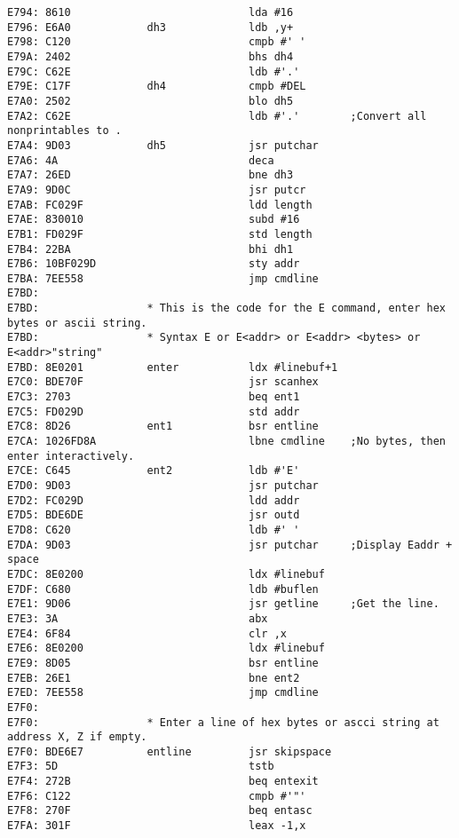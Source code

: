 {\begin{verbatim}
E794: 8610                            lda #16
E796: E6A0            dh3             ldb ,y+
E798: C120                            cmpb #' '
E79A: 2402                            bhs dh4
E79C: C62E                            ldb #'.'            
E79E: C17F            dh4             cmpb #DEL
E7A0: 2502                            blo dh5
E7A2: C62E                            ldb #'.'        ;Convert all nonprintables to .
E7A4: 9D03            dh5             jsr putchar
E7A6: 4A                              deca
E7A7: 26ED                            bne dh3
E7A9: 9D0C                            jsr putcr
E7AB: FC029F                          ldd length
E7AE: 830010                          subd #16
E7B1: FD029F                          std length
E7B4: 22BA                            bhi dh1
E7B6: 10BF029D                        sty addr
E7BA: 7EE558                          jmp cmdline
E7BD:                 
E7BD:                 * This is the code for the E command, enter hex bytes or ascii string.
E7BD:                 * Syntax E or E<addr> or E<addr> <bytes> or E<addr>"string"
E7BD: 8E0201          enter           ldx #linebuf+1
E7C0: BDE70F                          jsr scanhex
E7C3: 2703                            beq ent1
E7C5: FD029D                          std addr
E7C8: 8D26            ent1            bsr entline
E7CA: 1026FD8A                        lbne cmdline    ;No bytes, then enter interactively.            
E7CE: C645            ent2            ldb #'E'
E7D0: 9D03                            jsr putchar
E7D2: FC029D                          ldd addr 
E7D5: BDE6DE                          jsr outd
E7D8: C620                            ldb #' '
E7DA: 9D03                            jsr putchar     ;Display Eaddr + space
E7DC: 8E0200                          ldx #linebuf
E7DF: C680                            ldb #buflen
E7E1: 9D06                            jsr getline     ;Get the line.
E7E3: 3A                              abx
E7E4: 6F84                            clr ,x
E7E6: 8E0200                          ldx #linebuf
E7E9: 8D05                            bsr entline
E7EB: 26E1                            bne ent2
E7ED: 7EE558                          jmp cmdline 
E7F0:                 
E7F0:                 * Enter a line of hex bytes or ascci string at address X, Z if empty.
E7F0: BDE6E7          entline         jsr skipspace
E7F3: 5D                              tstb
E7F4: 272B                            beq entexit
E7F6: C122                            cmpb #'"'
E7F8: 270F                            beq entasc 
E7FA: 301F                            leax -1,x

\end{verbatim}}
